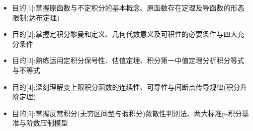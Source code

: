 \documentclass[11pt,a4paper,UTF8]{ctexart}
\begin{document}
\pagestyle{fancy}
\fancyhf{}
\fancyhead[R]{\small\color{TitlePurple}\nouppercase{\leftmark}}
\renewcommand{\headrulewidth}{0.5pt}

\tableofcontents
\newpage
{}


\begin{targetbox}[本章复习目标与核心知识图谱]
\begin{itemize}
  \item 目的[1]:掌握原函数与不定积分的基本概念、原函数存在定理及导函数的形态限制(达布定理)
\end{itemize}
\end{targetbox}

\begin{targetbox}[本章复习目标与核心知识图谱]
\begin{itemize}
  \item 目的[2]:掌握定积分黎曼和定义、几何代数意义及可积性的必要条件与四大充分条件
\end{itemize}
\end{targetbox}

\begin{targetbox}[本章复习目标与核心知识图谱]
\begin{itemize}
  \item 目的[3]:熟练运用定积分保号性、估值定理、积分第一中值定理分析积分等式与不等式
\end{itemize}
\end{targetbox}

\begin{targetbox}[本章复习目标与核心知识图谱]
\begin{itemize}
  \item 目的[4]:深刻理解变上限积分函数的连续性、可导性与间断点传导规律(积分升阶定理)
\end{itemize}
\end{targetbox}

\begin{targetbox}[本章复习目标与核心知识图谱]
\begin{itemize}
  \item 目的[5]:掌握反常积分(无穷区间型与瑕积分)敛散性判别法、两大标准p-积分基准与阶数压制模型
\end{itemize}
\end{targetbox}
\end{document}
